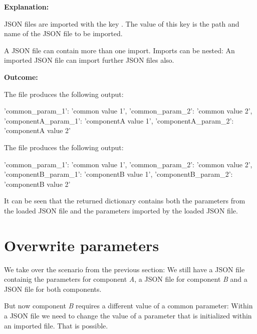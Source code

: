 \textbf{Explanation:}

\vspace{2ex}

JSON files are imported with the key . The value of this key is the path and name of the JSON file to be imported.

A JSON file can contain more than one import. Imports can be nested: An imported JSON file can import further JSON files also.


\newpage

\textbf{Outcome:}

The file  produces the following output:

\begin{pythonlog}
{'common_param_1': 'common value 1',
 'common_param_2': 'common value 2',
 'componentA_param_1': 'componentA value 1',
 'componentA_param_2': 'componentA value 2'}
\end{pythonlog}

The file  produces the following output:

\begin{pythonlog}
{'common_param_1': 'common value 1',
 'common_param_2': 'common value 2',
 'componentB_param_1': 'componentB value 1',
 'componentB_param_2': 'componentB value 2'}
\end{pythonlog}

It can be seen that the returned dictionary contains both the parameters from the loaded JSON file and the parameters imported by the loaded JSON file.



\section{Overwrite parameters}

We take over the scenario from the previous section: We still have a JSON file  containig the parameters for
component \textit{A}, a JSON file  for component \textit{B} and a JSON file  for both components.

But now component \textit{B} requires a different value of a common parameter: Within a JSON file we need to change the value of a parameter
that is initialized within an imported file. That is possible.

